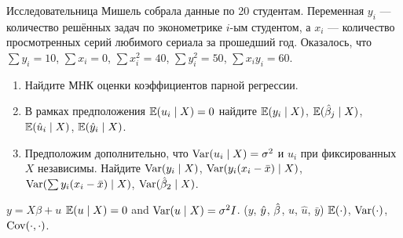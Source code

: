 \begin{problem}
Исследовательница Мишель собрала данные по 20 студентам. 
Переменная $y_i$ — количество решённых задач по эконометрике $i$-ым студентом, 
а $x_i$ — количество просмотренных серий любимого сериала за прошедший год. 
Оказалось, что $\sum y_i = 10$, $\sum x_i = 0$, $\sum x_i^2 = 40$, $\sum y_i^2 = 50$, $\sum x_i y_i = 60$.

\begin{enumerate}
\item Найдите МНК оценки коэффициентов парной регрессии.

\item В рамках предположения $\operatorname{\mathbb E}(u_i \mid X) = 0$ найдите $\operatorname{\mathbb E}(y_i \mid X)$, $\operatorname{\mathbb E}(\hat{\beta}_j \mid X)$, $\operatorname{\mathbb E}(\hat u_i \mid X)$, $\operatorname{\mathbb E}(\hat y_i \mid X)$.

\item Предположим дополнительно, что $\operatorname{Var}(u_i \mid X)=\sigma^2$ и $u_i$ при фиксированных $X$ независимы. 
Найдите $\operatorname{Var}(y_i \mid X)$, $\operatorname{Var}(y_i (x_i - \bar x) \mid X)$, $\operatorname{Var}(\sum y_i (x_i - \bar x) \mid X)$, $\operatorname{Var}(\hat{\beta}_2 \mid X)$.

\end{enumerate}

\begin{sol}
\end{sol}
\end{problem}

\begin{problem}
 $y=X\beta + u$ 
$\operatorname{\mathbb E}(u \mid X) = 0$ and $\operatorname{Var}(u \mid X) = \sigma^2 I$.
 ($y$, $\hat{y}$, $\hat{\beta}$, $u$, $\hat u$, $\bar y$) 
$\operatorname{\mathbb E}(\cdot)$, $\operatorname{Var}(\cdot)$, $\operatorname{Cov}(\cdot, \cdot)$.

\begin{sol}
\end{sol}
\end{problem}



